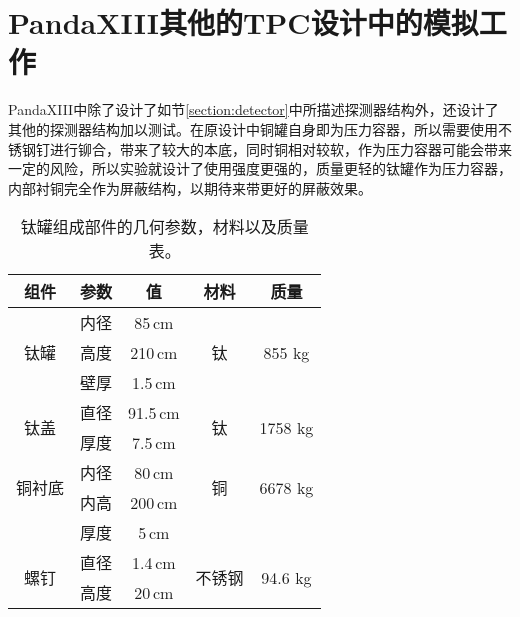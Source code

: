 
\chapter{PandaXIII其他的TPC设计中的模拟工作}

PandaXIII中除了设计了如节\ref{section:detector}中所描述探测器结构外，还设计了其他的探测器结构加以测试。在原设计中铜罐自身即为压力容器，所以需要使用不锈钢钉进行铆合，带来了较大的本底，同时铜相对较软，作为压力容器可能会带来一定的风险，所以实验就设计了使用强度更强的，质量更轻的钛罐作为压力容器，内部衬铜完全作为屏蔽结构，以期待来带更好的屏蔽效果。

\begin{table*}[hbt]
    \begin{center}
        \begin{tabular*}{0.75\textwidth}{@{\extracolsep{\fill}}ccccc}
        \hline
        \hline
        \textbf{组件}   &   \textbf{参数}   &   \textbf{值} &   \textbf{材料} & \textbf{质量} \\ \hline
        \multirow{3}{*}{钛罐} 
            &   内径&   85\,cm&     \multirow{3}{*}{钛} &   \multirow{3}{*}{855 kg} \\
            &   高度&   210\,cm&    &   \\   
            &   壁厚&   1.5\,cm&    &   \\\hline
        \multirow{2}{*}{钛盖} 
            & 直径 & 91.5\,cm & \multirow{2}{*}{钛} & \multirow{2}{*}{1758 kg} \\
            & 厚度 & 7.5\,cm &  &    \\\hline
        \multirow{2}{*}{铜衬底} 
            & 内径 & 80\,cm & \multirow{2}{*}{铜} & \multirow{2}{*}{6678 kg} \\
            & 内高 & 200\,cm &  &    \\
            & 厚度 & 5\,cm &  & \\\hline
        \multirow{2}{*}{螺钉} 
            & 直径 & 1.4\,cm & \multirow{2}{*}{不锈钢} & \multirow{2}{*}{94.6 kg} \\
            & 高度 & 20\,cm &  &    \\
        \hline
        \hline
        \end{tabular*}
        \caption{钛罐组成部件的几何参数，材料以及质量表。\supercite{cdr}}
        \label{tab:ti_structure}
    \end{center}
\end{table*}

